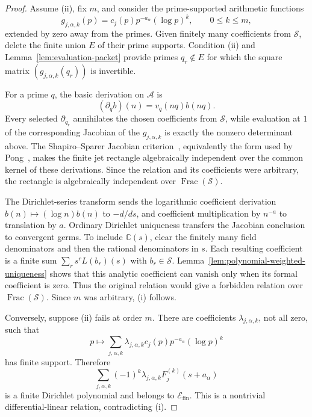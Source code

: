 \documentclass[11pt]{article}
\theoremstyle{definition}
\theoremstyle{remark}
\newcommand{\C}{\mathbb C}
\newcommand{\Frac}{\operatorname{Frac}}
\begin{document}
\begin{proof}
Assume (ii), fix \(m\), and consider the prime-supported arithmetic functions
\[
  g_{j,\alpha,k}(p)
  =c_j(p)p^{-a_\alpha}(\log p)^k,
  \qquad 0\leq k\leq m,
\]
extended by zero away from the primes.  Given finitely many coefficients from
\(\mathscr S\), delete the finite union \(E\) of their prime supports.  Condition (ii)
and Lemma~\ref{lem:evaluation-packet} provide primes \(q_r\notin E\) for which the square
matrix \((g_{j,\alpha,k}(q_r))\) is invertible.

For a prime \(q\), the basic derivation on \(\mathscr A\) is
\[
  (\partial_q b)(n)=v_q(nq)b(nq).
\]
Every selected \(\partial_{q_r}\) annihilates the chosen coefficients from
\(\mathscr S\), while evaluation at \(1\) of the corresponding Jacobian of the
\(g_{j,\alpha,k}\) is exactly the nonzero determinant above.  The
Shapiro--Sparer Jacobian criterion~\cite{ShapiroSparer1986}, equivalently the form used
by Pong~\cite[Sections~3--5]{Pong2016}, makes the finite jet rectangle algebraically
independent over the common kernel of these derivations.  Since the relation and its
coefficients were arbitrary, the rectangle is algebraically independent over
\(\Frac(\mathscr S)\).

The Dirichlet-series transform sends the logarithmic coefficient derivation
\(b(n)\mapsto(\log n)b(n)\) to \(-d/ds\), and coefficient multiplication by
\(n^{-a}\) to translation by \(a\).  Ordinary Dirichlet uniqueness transfers the
Jacobian conclusion to convergent germs.  To include \(\C(s)\), clear the finitely many
field denominators and then the rational denominators in \(s\).  Each resulting
coefficient is a finite sum \(\sum_rs^rL(b_r)(s)\) with \(b_r\in\mathscr S\).
Lemma~\ref{lem:polynomial-weighted-uniqueness} shows that this analytic coefficient can
vanish only when its formal coefficient is zero.  Thus the original relation would give a
forbidden relation over \(\Frac(\mathscr S)\).  Since \(m\) was arbitrary, (i) follows.

Conversely, suppose (ii) fails at order \(m\).  There are coefficients
\(\lambda_{j,\alpha,k}\), not all zero, such that
\[
  p\longmapsto
  \sum_{j,\alpha,k}
    \lambda_{j,\alpha,k}c_j(p)p^{-a_\alpha}(\log p)^k
\]
has finite support.  Therefore
\[
  \sum_{j,\alpha,k}
    (-1)^k\lambda_{j,\alpha,k}F_j^{(k)}(s+a_\alpha)
\]
is a finite Dirichlet polynomial and belongs to \(\mathscr E_{\mathrm{fin}}\).
This is a nontrivial differential-linear relation, contradicting (i).
\end{proof}
\end{document}
